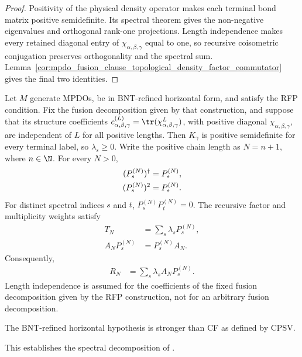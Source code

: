 \begin{proof}\leanok
    Positivity of the physical density operator makes each terminal bond
    matrix positive semidefinite. Its spectral theorem gives the
    non-negative eigenvalues and orthogonal rank-one projections. Length
    independence makes every retained diagonal entry of
    $\chi_{\alpha,\beta,\gamma}$ equal to one, so recursive coisometric
    conjugation preserves orthogonality and the spectral sum.
    Lemma~\ref{cor:mpdo_fusion_clause_topological_density_factor_commutator}
    gives the final two identities.
\end{proof}

\begin{lemma}%
    \label{thm:mpdo_terminal_spectral_projector_refinement}
    \leanok
    Let $M$ generate MPDOs, be in BNT-refined horizontal form,
    and satisfy the RFP condition. Fix the fusion decomposition given by
    that construction, and suppose that its structure coefficients
    $c_{\alpha,\beta,\gamma}^{(L)}
        =\tr(\chi_{\alpha,\beta,\gamma}^{L})$, with positive diagonal
    $\chi_{\alpha,\beta,\gamma}$, are independent of $L$ for all positive
    lengths.
    Then $K_\gamma$ is positive semidefinite for every terminal label, so
    $\lambda_s\geq0$. Write the positive chain length as $N=n+1$,
    where $n\in\N$. For every $N>0$,
    \begin{align}
        (P_s^{(N)})^\dagger
         & =P_s^{(N)},
        \notag         \\
        (P_s^{(N)})^2
         & =P_s^{(N)}.
        \notag
    \end{align}
    For distinct spectral indices $s$ and $t$, $P_s^{(N)}P_t^{(N)}=0$.
    The recursive factor and multiplicity weights satisfy
    \begin{align}
        T_N
         & =\sum_s\lambda_s P_s^{(N)},
        \label{eq:rfp_terminal_spectral_sum} \\
        A_NP_s^{(N)}
         & =P_s^{(N)}A_N.
        \label{eq:rfp_spectral_commutation}
    \end{align}
    Consequently,
    \begin{align}
        R_N
         & =\sum_s\lambda_s A_NP_s^{(N)}.
        \label{eq:rfp_density_spectral_sum}
    \end{align}
    Length independence is assumed for the coefficients of the fixed fusion
    decomposition given by the RFP construction, not for an arbitrary
    fusion decomposition.

    The BNT-refined horizontal hypothesis is stronger than CF
    as defined by CPSV.

    This establishes the spectral decomposition of
    \cite[lines~1003--1012]{Cirac2016MPDO_arXiv}.
\end{lemma}
